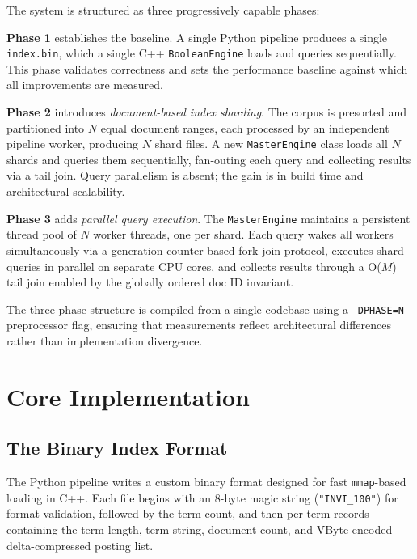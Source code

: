 \documentclass[twocolumn, 10pt]{article}
\begin{document}
The system is structured as three progressively capable phases:

\textbf{Phase 1} establishes the baseline. A single Python pipeline
produces a single \texttt{index.bin}, which a single C++
\texttt{BooleanEngine} loads and queries sequentially. This phase validates
correctness and sets the performance baseline against which all
improvements are measured.

\textbf{Phase 2} introduces \textit{document-based index sharding}. The
corpus is presorted and partitioned into $N$ equal document ranges, each
processed by an independent pipeline worker, producing $N$ shard files.
A new \texttt{MasterEngine} class loads all $N$ shards and queries them
sequentially, fan-outing each query and collecting results via a tail
join. Query parallelism is absent; the gain is in build time and
architectural scalability.

\textbf{Phase 3} adds \textit{parallel query execution}. The
\texttt{MasterEngine} maintains a persistent thread pool of $N$ worker
threads, one per shard. Each query wakes all workers simultaneously via a
generation-counter-based fork-join protocol, executes shard queries in
parallel on separate CPU cores, and collects results through a O($M$) tail
join enabled by the globally ordered doc ID invariant.

The three-phase structure is compiled from a single codebase using a
\texttt{-DPHASE=N} preprocessor flag, ensuring that measurements reflect
architectural differences rather than implementation divergence.


\section{Core Implementation}

\subsection{The Binary Index Format}

The Python pipeline writes a custom binary format designed for fast
\texttt{mmap}-based loading in C++. Each file begins with an 8-byte magic
string (\texttt{"INVI\_100"}) for format validation, followed by the
term count, and then per-term records containing the term length, term
string, document count, and VByte-encoded delta-compressed posting list.
\end{document}
